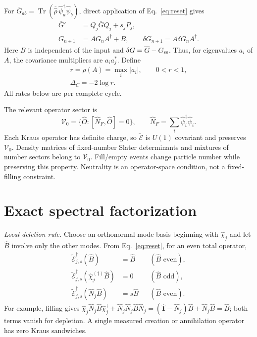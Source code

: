 \documentclass[aps,prb,twocolumn,10pt,nofootinbib,superscriptaddress]{revtex4-2}
\newcommand{\Id}{\hat{\mathbf{1}}}
\newcommand{\Tr}{\operatorname{Tr}}
\newcommand{\E}{\widetilde{\mathcal E}}
\begin{document}
For $\overline G_{ab}=\Tr(\overline{\hat\rho}\,
\hat\psi_a^\dagger\hat\psi_b)$, direct application of
Eq.~\eqref{eq:reset} gives
\begin{align}
 \overline G'&=Q_j\overline GQ_j+s_jP_j,\nonumber\\
 \overline G_{n+1}&=A\overline G_nA^\dagger+B,
 \qquad \delta G_{n+1}=A\delta G_nA^\dagger. \label{eq:cov}
\end{align}
Here $B$ is independent of the input and
$\delta G=\overline G-G_{\rm ss}$. Thus, for eigenvalues $a_i$ of $A$,
the covariance multipliers are $a_i a_j^*$. Define
\begin{equation}
 \begin{gathered}
 r=\rho(A)=\max_i|a_i|,\qquad 0<r<1,\\
 \Delta_C=-2\log r.
 \end{gathered} \label{eq:rate}
\end{equation}
All rates below are per complete cycle.

The relevant operator sector is
\begin{equation}
 \mathcal V_0=\{\hat O:[\hat N_F,\hat O]=0\},\qquad
 \hat N_F=\sum_i\hat\psi_i^\dagger\hat\psi_i. \label{eq:neutral}
\end{equation}
Each Kraus operator has definite charge, so $\E$ is $U(1)$ covariant
and preserves $\mathcal V_0$. Density matrices of fixed-number Slater
determinants and mixtures of number sectors belong to $\mathcal V_0$.
Fill/empty events change particle number while preserving this property.
Neutrality is an operator-space condition, not a fixed-filling constraint.

\section{Exact spectral factorization}
\textit{Local deletion rule.} Choose an orthonormal mode basis beginning
with $\hat\chi_j$ and let $\hat B$ involve only the other modes. From
Eq.~\eqref{eq:reset}, for an even total operator,
\begin{align}
 \E_{j,s}^\dagger(\hat B)&=\hat B &&(\hat B\text{ even}),\nonumber\\
 \E_{j,s}^\dagger(\hat\chi_j^{(\dagger)}\hat B)&=0
 &&(\hat B\text{ odd}),\nonumber\\
 \E_{j,s}^\dagger(\hat N_j\hat B)&=s\hat B
 &&(\hat B\text{ even}). \label{eq:rule}
\end{align}
For example, filling gives
$\hat\chi_j\hat N_j\hat B\hat\chi_j^\dagger
+\hat N_j\hat N_j\hat B\hat N_j
=(\Id-\hat N_j)\hat B+\hat N_j\hat B=\hat B$;
both terms vanish for depletion. A single measured creation or
annihilation operator has zero Kraus sandwiches.
\end{document}
